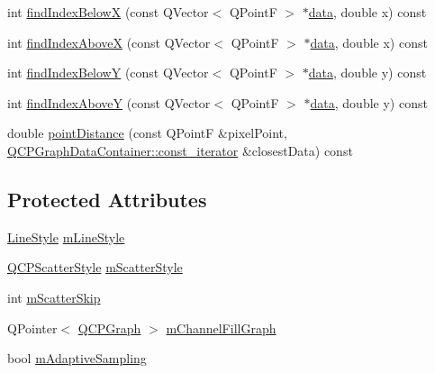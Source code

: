 \begin{DoxyCompactItemize}
\item 
int \mbox{\hyperlink{class_q_c_p_graph_a8c3f15dd5a06633011a6ef36016d308b}{find\+Index\+BelowX}} (const Q\+Vector$<$ Q\+PointF $>$ $\ast$\mbox{\hyperlink{class_q_c_p_graph_a141aa31a1f19bbd0ce60f55eaeb9ea60}{data}}, double x) const
\item 
int \mbox{\hyperlink{class_q_c_p_graph_aaabd6c6a7200a2672c44e62bd2a1cafa}{find\+Index\+AboveX}} (const Q\+Vector$<$ Q\+PointF $>$ $\ast$\mbox{\hyperlink{class_q_c_p_graph_a141aa31a1f19bbd0ce60f55eaeb9ea60}{data}}, double x) const
\item 
int \mbox{\hyperlink{class_q_c_p_graph_a5b0291f248e8ca8eaa82833ab420dcd0}{find\+Index\+BelowY}} (const Q\+Vector$<$ Q\+PointF $>$ $\ast$\mbox{\hyperlink{class_q_c_p_graph_a141aa31a1f19bbd0ce60f55eaeb9ea60}{data}}, double y) const
\item 
int \mbox{\hyperlink{class_q_c_p_graph_a8b952a5f937840dc242489585cc8000d}{find\+Index\+AboveY}} (const Q\+Vector$<$ Q\+PointF $>$ $\ast$\mbox{\hyperlink{class_q_c_p_graph_a141aa31a1f19bbd0ce60f55eaeb9ea60}{data}}, double y) const
\item 
double \mbox{\hyperlink{class_q_c_p_graph_a89acf99c0b52b8eecb2438adf7ec0170}{point\+Distance}} (const Q\+PointF \&pixel\+Point, \mbox{\hyperlink{class_q_c_p_data_container_ae40a91f5cb0bcac61d727427449b7d15}{Q\+C\+P\+Graph\+Data\+Container\+::const\+\_\+iterator}} \&closest\+Data) const
\end{DoxyCompactItemize}
\subsection*{Protected Attributes}
\begin{DoxyCompactItemize}
\item 
\mbox{\hyperlink{class_q_c_p_graph_ad60175cd9b5cac937c5ee685c32c0859}{Line\+Style}} \mbox{\hyperlink{class_q_c_p_graph_a8604fd98402035a63375849f7341ee25}{m\+Line\+Style}}
\item 
\mbox{\hyperlink{class_q_c_p_scatter_style}{Q\+C\+P\+Scatter\+Style}} \mbox{\hyperlink{class_q_c_p_graph_a4aa36241f166ccd1f75fc8f24e4a3247}{m\+Scatter\+Style}}
\item 
int \mbox{\hyperlink{class_q_c_p_graph_a4ca1e50fbfe8307022b42a6f6178fae0}{m\+Scatter\+Skip}}
\item 
Q\+Pointer$<$ \mbox{\hyperlink{class_q_c_p_graph}{Q\+C\+P\+Graph}} $>$ \mbox{\hyperlink{class_q_c_p_graph_a2f1777c7accf8244fc640c33f0b04577}{m\+Channel\+Fill\+Graph}}
\item 
bool \mbox{\hyperlink{class_q_c_p_graph_aa951e78aeba714cf443be6da2e52502e}{m\+Adaptive\+Sampling}}
\end{DoxyCompactItemize}
